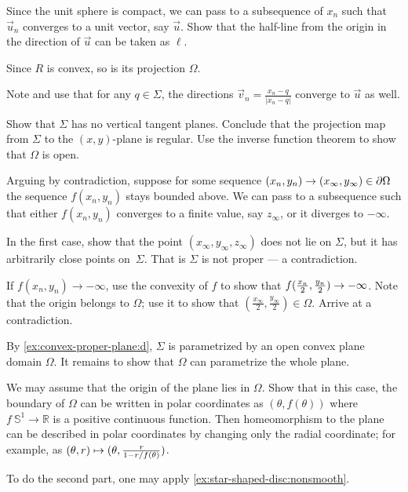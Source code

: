 \begin{multicols}{2}
Since the unit sphere is compact, we can pass to a subsequence of $x_n$ such that $\vec u_n$ converges to a unit vector, say $\vec u$.
Show that the half-line from the origin in the direction of $\vec u$ can be taken as $\ell$.

Since $R$ is convex, so is its projection $\Omega$.

Note and use that for any $q\in \Sigma$, the directions $\vec v_n=\tfrac{x_n-q}{|x_n-q|}$ converge to $\vec u$ as well.

Show that $\Sigma$ has no vertical tangent planes.
Conclude that the projection map from $\Sigma$ to the $(x,y)$-plane is regular.
Use the inverse function theorem to show that $\Omega$ is open.


Arguing by contradiction, suppose for some sequence $(x_n,y_n)\z\to(x_\infty,y_\infty)\in \partial\Omega$ the sequence $f(x_n,y_n)$ stays bounded above.
We can pass to a subsequence such that either $f(x_n,y_n)$ converges to a finite value, say $z_\infty$, or it diverges to $-\infty$.

In the first case, show that the point $(x_\infty, y_\infty,z_\infty)$ does not lie on $\Sigma$, but it has arbitrarily close points on~$\Sigma$.
That is $\Sigma$ is not proper --- a contradiction.

If $f(x_n,y_n)\to -\infty$, use the convexity of $f$ to show that $f(\tfrac{x_n}2 ,\tfrac{y_n}2)\z\to -\infty$.
Note that the origin belongs to $\Omega$;
use it to show that $(\tfrac{x_\infty}2, \tfrac{y_\infty}2)\in\Omega$.
Arrive at a contradiction.

By \ref{ex:convex-proper-plane:d}, $\Sigma$ is parametrized by an open convex plane domain $\Omega$.
It remains to show that $\Omega$ can parametrize the whole plane.

We may assume that the origin of the plane lies in $\Omega$.
Show that in this case, the boundary of $\Omega$ can be written in polar coordinates as $(\theta,f(\theta))$ where $f\:\mathbb{S}^1\to\mathbb{R}$ is a positive continuous function.
Then homeomorphism to the plane can be described in polar coordinates by changing only the radial coordinate;
for example, as 
$(\theta,r)\z\mapsto (\theta,
\tfrac{r}{1-r/f(\theta)})$.

To do the second part, one may apply \ref{ex:star-shaped-disc:nonsmooth}.



\end{multicols}
